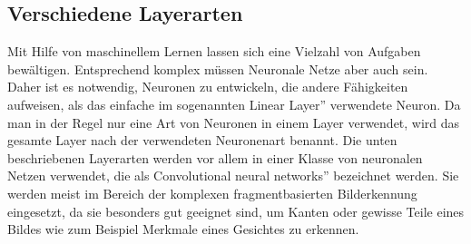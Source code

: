 \documentclass[11pt]{article}
\begin{document}
\subsection{Verschiedene Layerarten}
Mit Hilfe von maschinellem Lernen lassen sich eine Vielzahl von Aufgaben bewältigen. Entsprechend komplex müssen Neuronale Netze aber auch sein. Daher ist es notwendig, Neuronen zu entwickeln, die andere Fähigkeiten aufweisen, als das einfache im sogenannten \glqq Linear Layer'' verwendete Neuron. Da man in der Regel nur eine Art von Neuronen in einem Layer verwendet, wird das gesamte Layer nach der verwendeten Neuronenart benannt. Die unten beschriebenen Layerarten werden vor allem in einer Klasse von neuronalen Netzen verwendet, die als \glqq Convolutional neural networks'' bezeichnet werden. Sie werden meist im Bereich der komplexen fragmentbasierten Bilderkennung eingesetzt, da sie besonders gut geeignet sind, um Kanten oder gewisse Teile eines Bildes wie zum Beispiel Merkmale eines Gesichtes zu erkennen.
\end{document}
